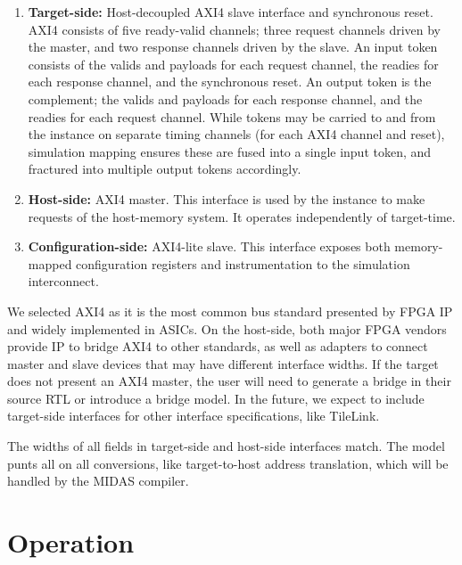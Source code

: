 \begin{enumerate}
    \item \textbf{Target-side:} Host-decoupled AXI4 slave
        interface and synchronous reset. AXI4 consists of five ready-valid
        channels; three request channels driven by the master, and two
        response channels driven by the slave.  An input token consists of
        the valids and payloads for each request channel, the readies for
        each response channel, and the synchronous reset.  An output token
        is the complement; the valids and payloads for each response
        channel, and the readies for each request channel.  While tokens
        may be carried to and from the instance on separate timing channels
        (for each AXI4 channel and reset), simulation mapping ensures
        these are fused into a single input token, and fractured into
        multiple output tokens accordingly.

    \item \textbf{Host-side:} AXI4 master. This interface is used by the
        instance to make requests of the host-memory system. It operates
        independently of target-time.

    \item \textbf{Configuration-side:} AXI4-lite slave. This interface exposes both
        memory-mapped configuration registers and instrumentation to the
        simulation interconnect.

\end{enumerate}

We selected AXI4 as it is the most common bus standard presented by FPGA IP and
widely implemented in ASICs. On the host-side, both major FPGA vendors provide
IP to bridge AXI4 to other standards, as well as adapters to connect master
and slave devices that may have different interface widths. If the target does
not present an AXI4 master, the user will need to generate a bridge in their
source RTL or introduce a bridge model. In the future, we expect to include
target-side interfaces for other interface specifications, like TileLink.

The widths of all fields in target-side and host-side interfaces match. The
model punts all on all conversions, like target-to-host address translation,
which will be handled by the MIDAS compiler.

\section{Operation}\label{sec:operation}

